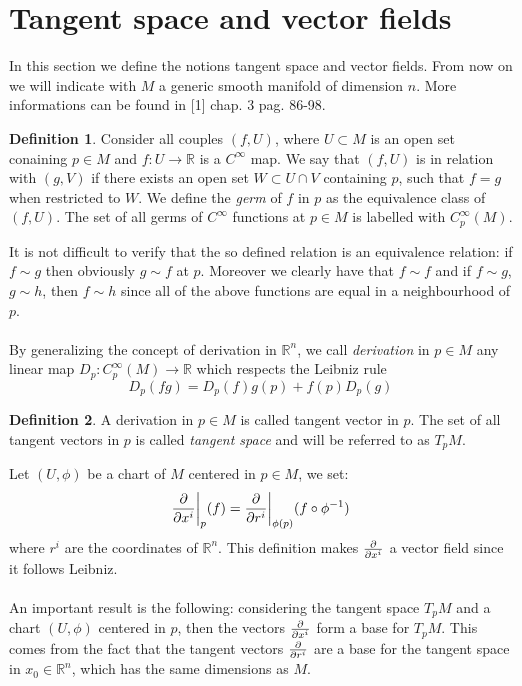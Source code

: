 \documentclass[12pt,a4paper]{report}
\theoremstyle{definition}
\newtheorem{Def}{Definition}[chapter]
\theoremstyle{Theorem}
\theoremstyle{definition}
\theoremstyle{definition}
\begin{document}
		\section{Tangent space and vector fields}
		In this section we define the notions tangent space and vector fields. From now on we will indicate with $M$ a generic smooth manifold of dimension $n$. More informations can be found in [1] chap. 3 pag. 86-98.
		\begin{Def}
			Consider all couples $(f,U)$, where $U\subset M$ is an open set conaining $p\in M$ and $f:U\rightarrow \mathbb{R}$ is a $C^\infty$ map. We say that $(f,U)$ is in relation with $(g,V)$ if there exists an open set $W\subset U\cap V$ containing $p$, such that $f=g$ when restricted to $W$. We define the \textit{germ} of $f$ in $p$ as the equivalence class of $(f,U)$.
			The set of all germs of $C^\infty$ functions at $p\in M$ is labelled with $C^\infty_p(M)$.
		\end{Def}
		It is not difficult to verify that the so defined relation is an equivalence relation: if $f\sim g$ then obviously $g\sim f$ at $p$. Moreover we clearly have that $f\sim f$ and if $f\sim g$, $g\sim h$, then $f\sim h$ since all of the above functions are equal in a neighbourhood of $p$.\\
		\\
		By generalizing the concept of derivation in $\mathbb{R}^n$, we call \textit{derivation} in $p\in M$ any linear map $D_p:C^\infty_p(M)\rightarrow\mathbb{R}$ which respects the Leibniz rule 
		$$D_p(fg)=D_p(f)g(p)+f(p)D_p(g)$$
		\begin{Def}
			A derivation in $p\in M$ is called tangent vector in $p$. The set of all tangent vectors in $p$ is called \textit{tangent space} and will be referred to as $T_pM$.
		\end{Def} 
		Let $(U,\phi)$ be a chart of $M$ centered in $p\in M$, we set:
		$${\partial\over \partial x^i}\bigg\rvert_p(f)={\partial\over \partial r^i}\bigg\rvert_{\phi(p)}(f\circ \phi^{-1})$$ where $r^i$ are the coordinates of $\mathbb{R}^n$. This definition makes ${\partial\over \partial x^i}$ a vector field since it follows Leibniz.\\
		\\
		An important result is the following: considering the tangent space $T_pM$ and a chart $(U,\phi)$ centered in $p$, then the vectors $\partial\over \partial x^i$ form a base for $T_pM$. This comes from the fact that the tangent vectors $\partial\over \partial r^i$ are a base for the tangent space in $x_0\in\mathbb{R}^n$, which has the same dimensions as $M$.\\
\end{document}
